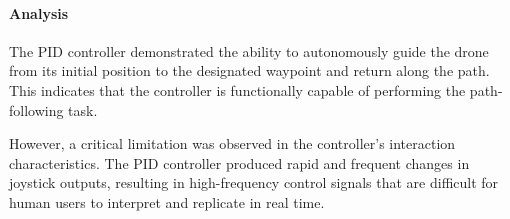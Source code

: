 \paragraph{Analysis}

The PID controller demonstrated the ability to autonomously guide the drone from its initial position to the designated waypoint and return along the path. This indicates that the controller is functionally capable of performing the path-following task.

However, a critical limitation was observed in the controller's interaction characteristics. The PID controller produced rapid and frequent changes in joystick outputs, resulting in high-frequency control signals that are difficult for human users to interpret and replicate in real time.

